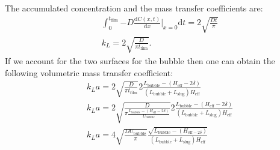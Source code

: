 \documentclass{article}
\begin{document}
\begin{description}
\begin{equation}
\end{equation}
The accumulated concentration and the mass transfer coefficients are:
\begin{equation}
\begin{aligned}
&\int_{0}^{t_{\mathrm{film}}}{-D\frac{\mathrm{d} C(x,t)}{\mathrm{d}x}|_{x=0} \mathrm{d}t}=2
\sqrt{ \frac{D t}{\pi}}\\
&k_L = 2 \sqrt{\frac{D}{\pi t_{\mathrm{film}}}}.
\end{aligned}
\end{equation}
If we account for the two surfaces for the bubble then one can obtain the following volumetric mass
transfer coefficient:
\begin{equation}
\begin{aligned}
&k_L a= 2\sqrt{\frac{D}{\pi t_{\mathrm{film}}}} 2
\frac{L_{\mathrm{bubble}}-(H_{\mathrm{eff}}-2\delta)}{(L_{\mathrm{bubble}}+L_{
\mathrm { slug } } )H_ { \mathrm { eff } } }\\
&k_L a= 2\sqrt{\frac{D}{\pi
\frac{L_{\mathrm{bubble}}-(H_{\mathrm{eff}}-2\delta)}{U_{\mathrm{bubble}}}}} 2
\frac{L_{\mathrm{bubble}}-(H_{\mathrm{eff}}-2\delta)}{(L_{\mathrm{bubble}}+L_{
\mathrm { slug } } )H_ { \mathrm { eff } } }\\
&k_L a=4 \sqrt{\frac{D U_{\mathrm{bubble}}}{\pi}}
\frac{\sqrt{L_{\mathrm{bubble}}-(H_{\mathrm{eff}-2\delta})}}{(L_{\mathrm{bubble}}+L_{\mathrm{slug}}
)H_ { \mathrm { eff } } }
\end{aligned}
\end{equation}


\end{description}
\end{document}
